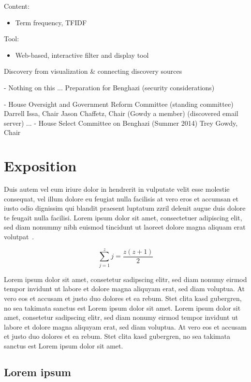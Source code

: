 \documentclass[journal]{vgtc}                %
\begin{document}
   
 Content:
\begin{itemize}
\item Term frequency, TFIDF
\end{itemize}

   
 Tool: 
\begin{itemize}
\item Web-based, interactive filter and display tool
\end{itemize}
    
    
Discovery from visualization \& connecting discovery sources



- Nothing on this ... Preparation for Benghazi (security considerations)

- House Oversight and Government Reform Committee (standing committee) 
  Darrell Issa, Chair
     Jason Chaffetz, Chair (Gowdy a member)
  (discovered email server)
    ... 
- House Select Committee on Benghazi (Summer 2014) 
   Trey Gowdy, Chair

\section{Exposition}

Duis autem vel eum iriure dolor in hendrerit in vulputate velit esse
molestie consequat, vel illum dolore eu feugiat nulla facilisis at
vero eros et accumsan et iusto odio dignissim qui blandit praesent
luptatum zzril delenit augue duis dolore te feugait nulla
facilisi. Lorem ipsum dolor sit amet, consectetuer adipiscing elit,
sed diam nonummy nibh euismod tincidunt ut laoreet dolore magna
aliquam erat volutpat~\cite{Kindlmann:1999:SAG}.

\begin{equation}
\sum_{j=1}^{z} j = \frac{z(z+1)}{2}
\end{equation}

Lorem ipsum dolor sit amet, consetetur sadipscing elitr, sed diam
nonumy eirmod tempor invidunt ut labore et dolore magna aliquyam erat,
sed diam voluptua. At vero eos et accusam et justo duo dolores et ea
rebum. Stet clita kasd gubergren, no sea takimata sanctus est Lorem
ipsum dolor sit amet. Lorem ipsum dolor sit amet, consetetur
sadipscing elitr, sed diam nonumy eirmod tempor invidunt ut labore et
dolore magna aliquyam erat, sed diam voluptua. At vero eos et accusam
et justo duo dolores et ea rebum. Stet clita kasd gubergren, no sea
takimata sanctus est Lorem ipsum dolor sit amet.

\subsection{Lorem ipsum}
\end{document}
